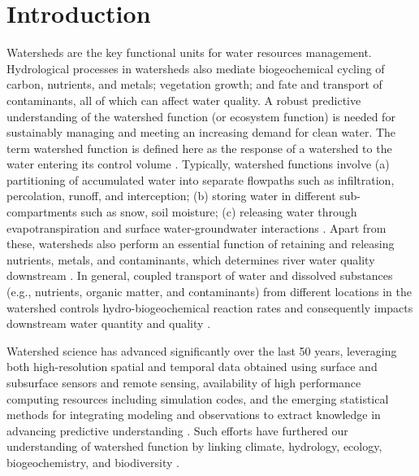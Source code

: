 \documentclass[preprint,review, 12pt]{elsarticle}
\begin{document}
\linenumbers
\section{Introduction}

Watersheds are the key functional units for water resources management. Hydrological processes in watersheds also mediate biogeochemical cycling of carbon, nutrients, and metals; vegetation growth; and fate and transport of contaminants, all of which can affect water quality. A robust predictive understanding of the watershed function (or ecosystem function) is needed for sustainably managing and meeting an increasing demand for clean water. The term watershed function is defined here as the response of a watershed to the water entering its control volume \citep{wagener2007catchment}. Typically, watershed functions involve (a) partitioning of accumulated water into separate flowpaths such as infiltration, percolation, runoff, and interception; (b) storing water in different sub-compartments such as snow, soil moisture; (c) releasing water through evapotranspiration and surface water-groundwater interactions \citep{Sivapalan2005, wagener2007catchment}. Apart from these, watersheds also perform an essential function of retaining and releasing nutrients, metals, and contaminants, which determines river water quality downstream \citep{Hubbard2018}. In general, coupled transport of water and dissolved substances (e.g., nutrients, organic matter, and contaminants) from different locations in the watershed controls hydro-biogeochemical reaction rates and consequently impacts downstream water quantity and quality \citep{kirchner2006getting}. 

Watershed science has advanced significantly over the last 50 years, leveraging both high-resolution spatial and temporal data obtained using surface and subsurface sensors and remote sensing, availability of high performance computing resources including simulation codes, and the emerging statistical methods for integrating modeling and observations to extract knowledge in advancing predictive understanding \citep{kirchner2006getting, wagener2007catchment, kirchner2004fine, Hubbard2018, gooseff2007relating, Beven2006a, bear2013dynamics}. Such efforts have furthered our understanding of watershed function by linking climate, hydrology, ecology, biogeochemistry, and biodiversity \citep{Graham2019}.
\end{document}
